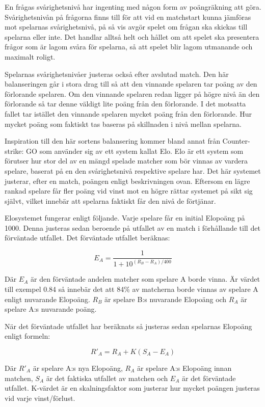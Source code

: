 \documentclass[12pt,a4paper]{article}
\begin{document}
En frågas svårighetsnivå har ingenting med någon form av poängräkning att göra. Svårighetsnivån på frågorna finns till för att vid en matchstart kunna jämföras mot spelarnas svårighetsnivå, på så vis avgör spelet om frågan ska skickas till spelarna eller inte. Det handlar alltså helt och hållet om att spelet ska presentera frågor som är lagom svåra för spelarna, så att spelet blir lagom utmanande och maximalt roligt.

Spelarnas svårighetsnivåer justeras också efter avslutad match. Den här balanseringen går i stora drag till så att den vinnande spelaren tar poäng av den förlorande spelaren. Om den vinnande spelaren redan ligger på högre nivå än den förlorande så tar denne väldigt lite poäng från den förlorande. I det motsatta fallet tar istället den vinnande spelaren mycket poäng från den förlorande. Hur mycket poäng som faktiskt tas baseras på skillnaden i nivå mellan spelarna. 

Inspiration till den här sortens balansering kommer bland annat från Counter-strike: GO \cite{cs} som använder sig av ett system kallat Elo\cite{elo}. Elo är ett system som förutser hur stor del av en mängd spelade matcher som bör vinnas av vardera spelare, baserat på en den svårighetsnivå respektive spelare har. Det här systemet justerar, efter en match, poängen enligt beskrivningen ovan. Eftersom en lägre rankad spelare får fler poäng vid vinst mot en högre rättar systemet på sikt sig självt, vilket innebär att spelarna faktiskt får den nivå de förtjänar.

Elosystemet fungerar enligt följande. Varje spelare får en initial Elopoäng på 1000. Denna justeras sedan beroende på utfallet av en match i förhållande till det förväntade utfallet. Det förväntade utfallet beräknas:

$$E_A = \frac{1}{1+10^{(R_B-R_A)/400}}$$

Där $E_A$ är den förväntade andelen matcher som spelare A borde vinna. Är värdet till exempel 0.84 så innebär det att 84\% av matcherna borde vinnas av spelare A enligt nuvarande Elopoäng. $R_B$ är spelare B:s nuvarande Elopoäng och $R_A$ är spelare A:s nuvarande poäng.

När det förväntade utfallet har beräknats så justeras sedan spelarnas Elopoäng enligt formeln:

$$R'_A = R_A + K(S_A-E_A)$$

Där $R'_A$ är spelare A:s nya Elopoäng, $R_A$ är spelare A:s Elopoäng innan matchen, $S_A$ är det faktiska utfallet av matchen och $E_A$ är det förväntade utfallet. K-värdet är en skalningsfaktor som justerar hur mycket poängen justeras vid varje vinst/förlust.
\end{document}
